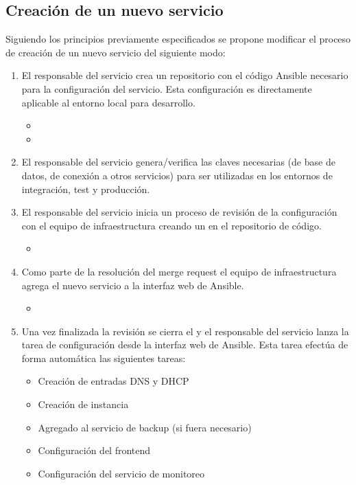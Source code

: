 \subsection{Creación de un nuevo servicio}
%
Siguiendo los principios previamente especificados se propone
modificar el proceso de creación de un nuevo servicio del siguiente
modo:
%
\begin{enumerate}
\item El responsable del servicio crea un repositorio con el código
  Ansible necesario para la configuración del servicio. Esta
  configuración es directamente aplicable al entorno local para
  desarrollo.
\begin{itemize}
\item {}
\item {}
\end{itemize}
\item El responsable del servicio genera/verifica las claves
  necesarias (de base de datos, de conexión a otros servicios) para
  ser utilizadas en los entornos de integración, test y producción.
\item El responsable del servicio inicia un proceso de revisión de la
  configuración con el equipo de infraestructura creando un
   en el repositorio de código.
\begin{itemize}
\item {}
\end{itemize}
\item Como parte de la resolución del merge request el equipo de
  infraestructura agrega el nuevo servicio a la interfaz web de
  Ansible.
\begin{itemize}
\item {}
\end{itemize}
\item Una vez finalizada la revisión se cierra el  y el responsable del servicio lanza la tarea de
  configuración desde la interfaz web de Ansible. Esta tarea efectúa
  de forma automática las siguientes tareas:
\begin{itemize}
\item Creación de entradas DNS y DHCP
\item Creación de instancia
\item Agregado al servicio de backup (si fuera necesario)
\item Configuración del frontend
\item Configuración del servicio de monitoreo
\end{itemize}
\end{enumerate}
